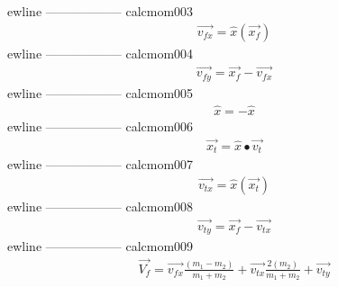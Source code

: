 ewline
------------------
\newline
calcmom003\newline
\begin{equation*}
 \begin{split}
 \vec{v_{fx}}=\hat{x}\left(\vec{x_f}\right)\end{split}
 \end{equation*}
ewline
------------------
\newline
calcmom004\newline
\begin{equation*}
 \begin{split}
 \vec{v_{fy}}=\vec{x_f}-\vec{v_{fx}}\end{split}
 \end{equation*}
ewline
------------------
\newline
calcmom005\newline
\begin{equation*}
 \begin{split}
 \hat{x}=-\hat{x}\end{split}
 \end{equation*}
ewline
------------------
\newline
calcmom006\newline
\begin{equation*}
 \begin{split}
 \vec{x_t}=\hat{x}\bullet\vec{v_t}\end{split}
 \end{equation*}
ewline
------------------
\newline
calcmom007\newline
\begin{equation*}
 \begin{split}
 \vec{v_{tx}}=\hat{x}\left(\vec{x_t}\right)\end{split}
 \end{equation*}
ewline
------------------
\newline
calcmom008\newline
\begin{equation*}
 \begin{split}
 \vec{v_{ty}}=\vec{x_f}-\vec{v_{tx}}\end{split}
 \end{equation*}
ewline
------------------
\newline
calcmom009\newline
\begin{equation*}
 \begin{split}
 \vec{V_f} = \vec{v_{fx}}\frac{(m_1-m_2)}{m_1+m_2}+\vec{v_{tx}}\frac{2(m_2)}{m_1+m_2}+\vec{v_{ty}}\end{split}
 \end{equation*}
